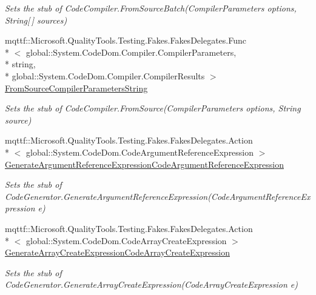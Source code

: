 \begin{DoxyCompactItemize}
\begin{DoxyCompactList}\small\item\em Sets the stub of Code\-Compiler.\-From\-Source\-Batch(\-Compiler\-Parameters options, String\mbox{[}$\,$\mbox{]} sources)\end{DoxyCompactList}\item 
mqttf\-::\-Microsoft.\-Quality\-Tools.\-Testing.\-Fakes.\-Fakes\-Delegates.\-Func\\*
$<$ global\-::\-System.\-Code\-Dom.\-Compiler.\-Compiler\-Parameters, \\*
string, \\*
global\-::\-System.\-Code\-Dom.\-Compiler.\-Compiler\-Results $>$ \hyperlink{class_system_1_1_code_dom_1_1_compiler_1_1_fakes_1_1_stub_code_compiler_aed00ae47ba33358aee75a5f2a556e50c}{From\-Source\-Compiler\-Parameters\-String}
\begin{DoxyCompactList}\small\item\em Sets the stub of Code\-Compiler.\-From\-Source(\-Compiler\-Parameters options, String source)\end{DoxyCompactList}\item 
mqttf\-::\-Microsoft.\-Quality\-Tools.\-Testing.\-Fakes.\-Fakes\-Delegates.\-Action\\*
$<$ global\-::\-System.\-Code\-Dom.\-Code\-Argument\-Reference\-Expression $>$ \hyperlink{class_system_1_1_code_dom_1_1_compiler_1_1_fakes_1_1_stub_code_compiler_a75670e593c38fce395b3d4870e219a11}{Generate\-Argument\-Reference\-Expression\-Code\-Argument\-Reference\-Expression}
\begin{DoxyCompactList}\small\item\em Sets the stub of Code\-Generator.\-Generate\-Argument\-Reference\-Expression(\-Code\-Argument\-Reference\-Expression e)\end{DoxyCompactList}\item 
mqttf\-::\-Microsoft.\-Quality\-Tools.\-Testing.\-Fakes.\-Fakes\-Delegates.\-Action\\*
$<$ global\-::\-System.\-Code\-Dom.\-Code\-Array\-Create\-Expression $>$ \hyperlink{class_system_1_1_code_dom_1_1_compiler_1_1_fakes_1_1_stub_code_compiler_a65878db14d81f21f65e4e37465644802}{Generate\-Array\-Create\-Expression\-Code\-Array\-Create\-Expression}
\begin{DoxyCompactList}\small\item\em Sets the stub of Code\-Generator.\-Generate\-Array\-Create\-Expression(\-Code\-Array\-Create\-Expression e)\end{DoxyCompactList}\item 

\end{DoxyCompactItemize}
